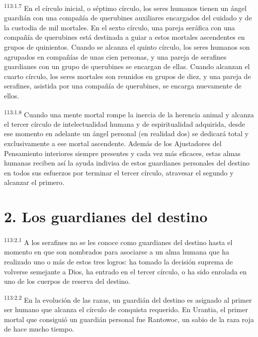 \documentclass[twoside, 11pt]{book}
\begin{document}
\par
\textsuperscript{113:1.7} En el círculo inicial, o séptimo círculo, los seres humanos tienen un ángel guardián con una compañía de querubines auxiliares encargados del cuidado y de la custodia de mil mortales. En el sexto círculo, una pareja seráfica con una compañía de querubines está destinada a guiar a estos mortales ascendentes en grupos de quinientos. Cuando se alcanza el quinto círculo, los seres humanos son agrupados en compañías de unas cien personas, y una pareja de serafines guardianes con un grupo de querubines se encargan de ellas. Cuando alcanzan el cuarto círculo, los seres mortales son reunidos en grupos de diez, y una pareja de serafines, asistida por una compañía de querubines, se encarga nuevamente de ellos.

\par
\textsuperscript{113:1.8} Cuando una mente mortal rompe la inercia de la herencia animal y alcanza el tercer círculo de intelectualidad humana y de espiritualidad adquirida, desde ese momento en adelante un ángel personal (en realidad dos) se dedicará total y exclusivamente a ese mortal ascendente. Además de los Ajustadores del Pensamiento interiores siempre presentes y cada vez más eficaces, estas almas humanas reciben así la ayuda indivisa de estos guardianes personales del destino en todos sus esfuerzos por terminar el tercer círculo, atravesar el segundo y alcanzar el primero.

\section*{2. Los guardianes del destino}
\par
\textsuperscript{113:2.1} A los serafines no se les conoce como guardianes del destino hasta el momento en que son nombrados para asociarse a un alma humana que ha realizado uno o más de estos tres logros: ha tomado la decisión suprema de volverse semejante a Dios, ha entrado en el tercer círculo, o ha sido enrolada en uno de los cuerpos de reserva del destino.

\par
\textsuperscript{113:2.2} En la evolución de las razas, un guardián del destino es asignado al primer ser humano que alcanza el círculo de conquista requerido. En Urantia, el primer mortal que consiguió un guardián personal fue Rantowoc, un sabio de la raza roja de hace mucho tiempo.
\end{document}
